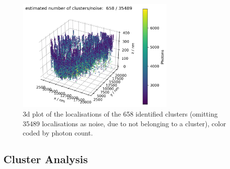\documentclass[11pt, a4paper, oneside, twocolumn]{report}
\begin{document}
\begin{figure}[h!]
  \centering
  \includegraphics[width=0.7\textwidth]{6_clustering.png}
  \caption{3d plot of the localisations of the 658 identified clusters
    (omitting 35489 localisations as noise, due to not belonging to a
    cluster), color coded by photon count.}
  \label{f:6_clustering}
\end{figure}


\subsection{Cluster Analysis}
\end{document}
